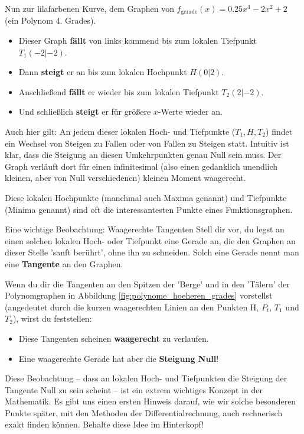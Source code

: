 Nun zur lilafarbenen Kurve, dem Graphen von \textbf{$f_{\text{gerade}}(x) = 0.25x^4 - 2x^2 + 2$} (ein Polynom 4. Grades).
\begin{itemize}
    \item Dieser Graph \textbf{fällt} von links kommend bis zum lokalen Tiefpunkt $T_1(-2 | -2)$.
    \item Dann \textbf{steigt} er an bis zum lokalen Hochpunkt $H(0 | 2)$.
    \item Anschließend \textbf{fällt} er wieder bis zum lokalen Tiefpunkt $T_2(2 | -2)$.
    \item Und schließlich \textbf{steigt} er für größere $x$-Werte wieder an.
\end{itemize}
Auch hier gilt: An jedem dieser lokalen Hoch- und Tiefpunkte ($T_1, H, T_2$) findet ein Wechsel von Steigen zu Fallen oder von Fallen zu Steigen statt. Intuitiv ist klar, dass die Steigung an diesen Umkehrpunkten genau Null sein muss. Der Graph verläuft dort für einen infinitesimal (also einen gedanklich unendlich kleinen, aber von Null verschiedenen) kleinen Moment waagerecht.

Diese lokalen Hochpunkte (manchmal auch Maxima genannt) und Tiefpunkte (Minima genannt) sind oft die interessantesten Punkte eines Funktionsgraphen.

\begin{infoboxumgebung}{Eine wichtige Beobachtung: Waagerechte Tangenten}
Stell dir vor, du legst an einen solchen lokalen Hoch- oder Tiefpunkt eine Gerade an, die den Graphen an dieser Stelle 'sanft berührt', ohne ihn zu schneiden. Solch eine Gerade nennt man eine \textbf{Tangente} an den Graphen.

Wenn du dir die Tangenten an den Spitzen der 'Berge' und in den 'Tälern' der Polynomgraphen in Abbildung \ref{fig:polynome_hoeheren_grades} vorstellst (angedeutet durch die kurzen waagerechten Linien an den Punkten H, $P_t$, $T_1$ und $T_2$), wirst du feststellen:
\begin{itemize}
    \item Diese Tangenten scheinen \textbf{waagerecht} zu verlaufen.
    \item Eine waagerechte Gerade hat aber die \textbf{Steigung Null}!
\end{itemize}
Diese Beobachtung – dass an lokalen Hoch- und Tiefpunkten die Steigung der Tangente Null zu sein scheint – ist ein extrem wichtiges Konzept in der Mathematik. Es gibt uns einen ersten Hinweis darauf, wie wir solche besonderen Punkte später, mit den Methoden der Differentialrechnung, auch rechnerisch exakt finden können. Behalte diese Idee im Hinterkopf!
\end{infoboxumgebung}


